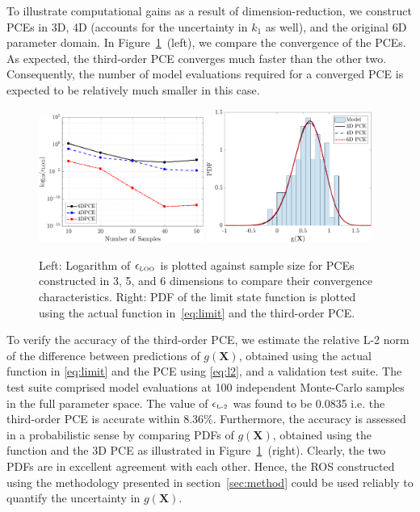 To illustrate computational gains as a
result of dimension-reduction, we construct PCEs in 3D, 4D (accounts for the
uncertainty in $k_1$ as well), and the original 6D parameter domain. In
Figure~\ref{fig:conv_osc}~(left), we compare the convergence of the
PCEs. As expected, the third-order PCE converges much faster than the other
two. Consequently, the number of model evaluations required for a converged PCE
is expected to be relatively much smaller in this case.  
\begin{figure}[htbp]
 \begin{center}
  \includegraphics[width=0.48\textwidth]{./Figures/err_samples_oscillator}
  \includegraphics[width=0.48\textwidth]{./Figures/pdf_comp_oscillator}
\caption{Left: Logarithm of $\epsilon_{\mbox{\tiny{LOO}}}$ is plotted against sample size for 
PCEs constructed in 3, 5, and 6 dimensions to compare their convergence characteristics. 
Right: PDF of the limit state function is plotted using the actual function in~\eqref{eq:limit}
and the third-order PCE.}
\label{fig:conv_osc}
\end{center}
\end{figure}

To verify the accuracy of the third-order PCE, we estimate the relative L-2
norm of the difference between predictions of  $g(\bm{X})$, obtained using the
actual function in \eqref{eq:limit} and the 
PCE using \eqref{eq:l2}, and a validation test suite. The test suite comprised
model evaluations at 100 independent Monte-Carlo samples in the full 
parameter space. The value of $\epsilon_{\mbox{\tiny{L-2}}}$ 
was found to be 0.0835 i.e. the third-order PCE is accurate within 8.36$\%$.
Furthermore, the accuracy is assessed in a probabilistic sense by comparing
PDFs of $g(\bm{X})$, obtained using the function and the 3D PCE as illustrated
in Figure~\ref{fig:conv_osc}~(right).  Clearly, the two PDFs are in excellent
agreement with each other. Hence, the ROS constructed using the methodology
presented in section~\ref{sec:method} could be used reliably to 
quantify the uncertainty in $g(\bm{X})$.

